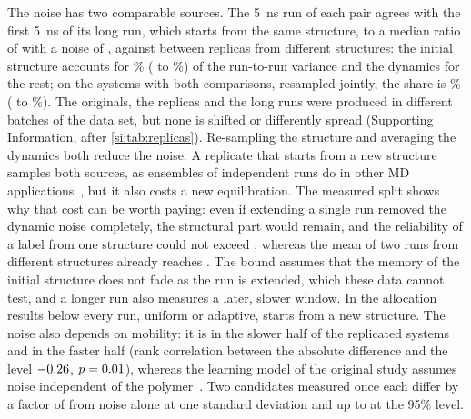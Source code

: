 \documentclass[journal=jcisd8,manuscript=article,email=true]{achemso}
\begin{document}
The noise has two comparable sources. The \SI{5}{\nano\second} run of each pair agrees with the
first \SI{5}{\nano\second} of its long run, which starts from the same structure, to a median
ratio of \techoEndShortPrefRatio{} with a noise of \techoEndSdDyn, against \RepEndSd{} between
replicas from different structures: the initial structure accounts for
\techoEndFracStructPct\% (\techoEndFracStructLo{} to \techoEndFracStructHi\%) of the run-to-run variance
and the dynamics for the rest; on the \techoEndJointN{} systems with both comparisons, resampled
jointly, the share is \techoEndJointFracStructPct\% (\techoEndJointFracStructLo{} to
\techoEndJointFracStructHi\%). The originals, the replicas and the long runs were produced in
different batches of the data set, but none is shifted or differently spread
(Supporting Information, after \cref{si:tab:replicas}). Re-sampling the structure and averaging the dynamics both reduce the
noise. A replicate that starts from a new structure samples both sources, as ensembles of
independent runs do in other MD applications~\cite{Coveney2016Ensembles}, but it also costs a new
equilibration. The measured split shows why that cost can be worth paying: even if extending a
single run removed the dynamic noise completely, the structural part would remain, and the
reliability of a label from one structure could not exceed \techoEndOneStructMax, whereas the
mean of two runs from different structures already reaches \techoEndRelTwo. The bound assumes
that the memory of the initial structure does not fade as the run is extended, which these data
cannot test, and a longer run also measures a later, slower window. In the allocation results
below every run, uniform or adaptive, starts from a new structure. The noise
also depends on mobility: it is \techoEndSdSlow{} in the slower half of the replicated systems and
\techoEndSdFast{} in the faster half (rank correlation between the absolute difference and the
level $-0.26$, $p=0.01$), whereas the learning model of the original study assumes
noise independent of the polymer~\cite{Xie2022Accelerating}. Two candidates measured once each
differ by a factor of \RepEndPairFactor{} from noise alone at one standard deviation and up to
\RepEndPairFactorNinetyFive{} at the 95\% level.
\end{document}
